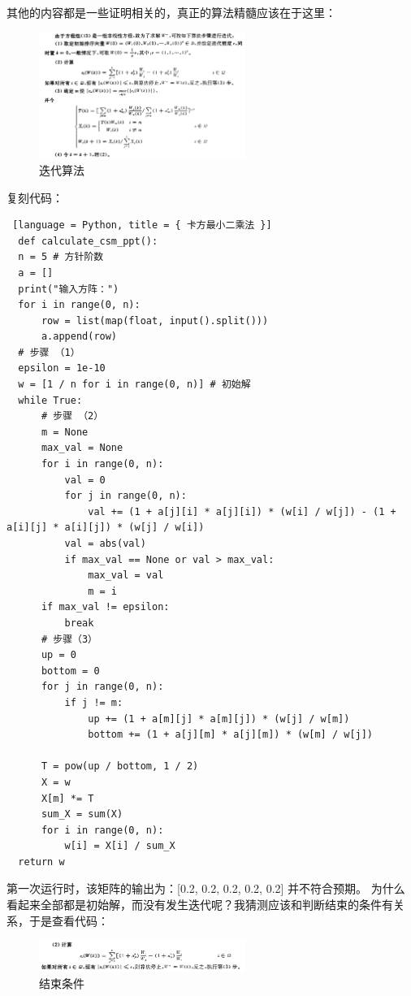 其他的内容都是一些证明相关的，真正的算法精髓应该在于这里：

\begin{figure}[H]
  \centering
  \includegraphics[width=0.6\textwidth]{img6/CSM2.png}
  \caption{迭代算法}
\end{figure}

复刻代码：

\begin{lstlisting} [language = Python, title = { 卡方最小二乘法 }]
  def calculate_csm_ppt():
  n = 5 # 方针阶数
  a = []
  print("输入方阵：")
  for i in range(0, n):
      row = list(map(float, input().split()))
      a.append(row)
  # 步骤 （1）
  epsilon = 1e-10
  w = [1 / n for i in range(0, n)] # 初始解
  while True:
      # 步骤 （2）
      m = None
      max_val = None
      for i in range(0, n):
          val = 0
          for j in range(0, n):
              val += (1 + a[j][i] * a[j][i]) * (w[i] / w[j]) - (1 + a[i][j] * a[i][j]) * (w[j] / w[i])
          val = abs(val)
          if max_val == None or val > max_val:
              max_val = val
              m = i
      if max_val != epsilon:
          break
      # 步骤（3）
      up = 0
      bottom = 0
      for j in range(0, n):
          if j != m:
              up += (1 + a[m][j] * a[m][j]) * (w[j] / w[m])
              bottom += (1 + a[j][m] * a[j][m]) * (w[m] / w[j])

      T = pow(up / bottom, 1 / 2)
      X = w
      X[m] *= T
      sum_X = sum(X)
      for i in range(0, n):
          w[i] = X[i] / sum_X
  return w
\end{lstlisting}

第一次运行时，该矩阵的输出为：[0.2, 0.2, 0.2, 0.2, 0.2] 并不符合预期。
为什么看起来全部都是初始解，而没有发生迭代呢？我猜测应该和判断结束的条件有关系，于是查看代码：

\begin{figure} [H]
  \centering
  \includegraphics[width=0.6\textwidth]{img6/CSM3.png}
  \caption{结束条件}
\end{figure}


